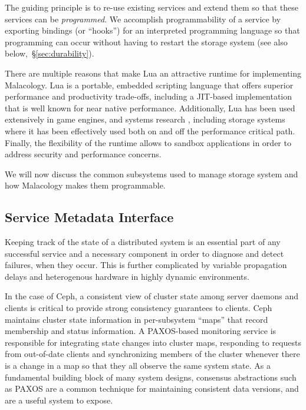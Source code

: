 \documentclass[preprint]{sigplanconf-eurosys}
\begin{document}
The guiding principle
is to re-use existing services and extend them so that these services can be
\emph{programmed}. We accomplish programmability of a service by exporting
bindings (or ``hooks'') for an interpreted programming language so that
programming can occur without having to restart the storage system (see also
below,~\S\ref{sec:durability}). 

There are multiple reasons that make Lua an attractive runtime for implementing
Malacology. Lua is a portable, embedded scripting language that offers superior
performance and productivity trade-offs, including a JIT-based implementation
that is well known for near native performance. Additionally, Lua has been used
extensively in game engines, and systems research \cite{neto:dls14-luaos},
including storage systems where it has been effectively used both on
\cite{grawinkel:pdsw2012-lua,watkins2013:bdmc13-in-vivo,geambasu_comet_2010}
and off \cite{sevilla:sc15-mantle} the performance critical path. Finally, the
flexibility of the runtime allows to sandbox applications in order to address
security and performance concerns.

We will now discuss the common subsystems used to manage storage system and how
Malacology makes them programmable.

\subsection{Service Metadata Interface}
\label{sec:mon}
\label{service-metadata}

Keeping track of the state of a distributed system is an essential part of any
successful service and a necessary component in order to diagnose and detect
failures, when they occur. This is further complicated by variable propagation
delays and heterogenous hardware in highly dynamic environments.


In the case of Ceph, a consistent view of cluster state among server daemons
and clients is critical to provide strong consistency guarantees to clients.
Ceph maintains cluster state information in per-subsystem ``maps'' that record
membership and status information.  A PAXOS-based monitoring service is
responsible for integrating state changes into cluster maps, responding to
requests from out-of-date clients and synchronizing members of the cluster
whenever there is a change in a map so that they all observe the same system
state. As a fundamental building block of many system designs, consensus
abstractions such as PAXOS are a common technique for maintaining consistent
data versions, and are a useful system to expose.
\end{document}
